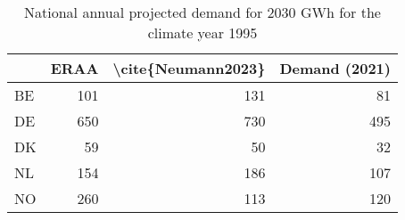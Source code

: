 \begin{table}
\centering
\caption{National annual projected demand for 2030  GWh for the climate year 1995}
\begin{tabular}{lrrr}
\toprule
{} &  ERAA &  \textbackslash cite\{Neumann2023\} &  Demand (2021) \\
\midrule
BE &   101 &                 131 &             81 \\
DE &   650 &                 730 &            495 \\
DK &    59 &                  50 &             32 \\
NL &   154 &                 186 &            107 \\
NO &   260 &                 113 &            120 \\
\bottomrule
\end{tabular}
\end{table}
